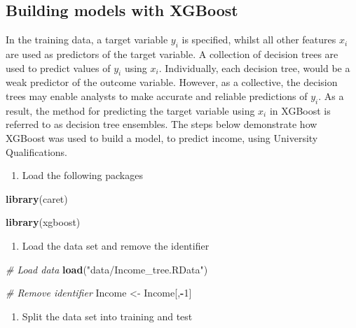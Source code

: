 \documentclass[]{book}
\newenvironment{Shaded}{\begin{snugshade}}{\end{snugshade}}
\newcommand{\KeywordTok}[1]{\textcolor[rgb]{0.13,0.29,0.53}{\textbf{#1}}}
\newcommand{\DecValTok}[1]{\textcolor[rgb]{0.00,0.00,0.81}{#1}}
\newcommand{\StringTok}[1]{\textcolor[rgb]{0.31,0.60,0.02}{#1}}
\newcommand{\CommentTok}[1]{\textcolor[rgb]{0.56,0.35,0.01}{\textit{#1}}}
\newcommand{\OperatorTok}[1]{\textcolor[rgb]{0.81,0.36,0.00}{\textbf{#1}}}
\newcommand{\NormalTok}[1]{#1}
\providecommand{\tightlist}{%
  \setlength{\itemsep}{0pt}\setlength{\parskip}{0pt}}
\begin{document}
\subsection{Building models with
XGBoost}\label{building-models-with-xgboost}

In the training data, a target variable \(y_{i}\) is specified, whilst
all other features \(x_{i}\) are used as predictors of the target
variable. A collection of decision trees are used to predict values of
\(y_{i}\) using \(x_{i}\). Individually, each decision tree, would be a
weak predictor of the outcome variable. However, as a collective, the
decision trees may enable analysts to make accurate and reliable
predictions of \(y_{i}\). As a result, the method for predicting the
target variable using \(x_{i}\) in XGBoost is referred to as decision
tree ensembles. The steps below demonstrate how XGBoost was used to
build a model, to predict income, using University Qualifications.

\begin{enumerate}
\def\labelenumi{\arabic{enumi})}
\tightlist
\item
  Load the following packages
\end{enumerate}

\begin{Shaded}
\begin{Highlighting}[]
\KeywordTok{library}\NormalTok{(caret)}

\KeywordTok{library}\NormalTok{(xgboost)}
\end{Highlighting}
\end{Shaded}

\begin{enumerate}
\def\labelenumi{\arabic{enumi})}
\setcounter{enumi}{1}
\tightlist
\item
  Load the data set and remove the identifier
\end{enumerate}

\begin{Shaded}
\begin{Highlighting}[]
\CommentTok{# Load data}
\KeywordTok{load}\NormalTok{(}\StringTok{"data/Income_tree.RData"}\NormalTok{)}

\CommentTok{# Remove identifier}
\NormalTok{Income <-}\StringTok{ }\NormalTok{Income[,}\OperatorTok{-}\DecValTok{1}\NormalTok{]}
\end{Highlighting}
\end{Shaded}

\begin{enumerate}
\def\labelenumi{\arabic{enumi})}
\setcounter{enumi}{2}
\tightlist
\item
  Split the data set into training and test
\end{enumerate}
\end{document}
